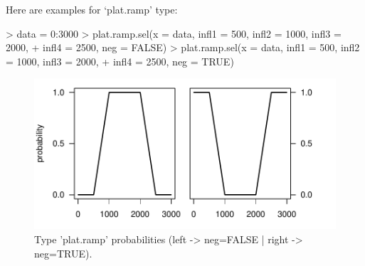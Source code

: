 \documentclass[letterpaper, 12pt]{article}
\begin{document}
\newpage

Here are examples for `plat.ramp' type:
\begin{Schunk}
\begin{Sinput}
> data = 0:3000
> plat.ramp.sel(x = data, infl1 = 500, infl2 = 1000, infl3 = 2000, 
+     infl4 = 2500, neg = FALSE)
> plat.ramp.sel(x = data, infl1 = 500, infl2 = 1000, infl3 = 2000, 
+     infl4 = 2500, neg = TRUE)
\end{Sinput}
\end{Schunk}
\begin{figure}[h]
\vspace{-20pt}
\begin{center}
\includegraphics{relation_sel-019}
\end{center}
\vspace{-30pt}
\caption{Type 'plat.ramp' probabilities (left -> neg=FALSE |  right -> neg=TRUE).}
\vspace{-10pt}
\label{fig9}
\end{figure}
\end{document}
